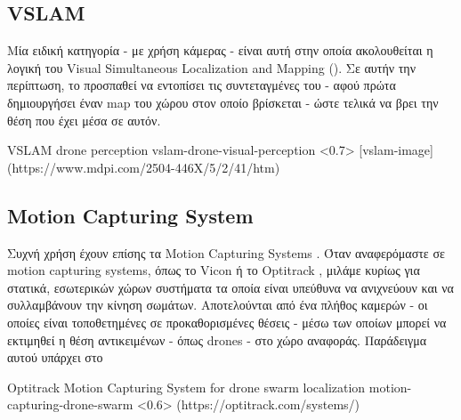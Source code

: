 \subsection{VSLAM}	\label{sec:related-vslam}
Μία ειδική κατηγορία - με χρήση κάμερας - είναι αυτή στην οποία ακολουθείται η λογική του Visual Simultaneous Localization and Mapping (). Σε αυτήν την περίπτωση, το  προσπαθεί να εντοπίσει τις συντεταγμένες του - αφού πρώτα δημιουργήσει έναν map του χώρου στον οποίο βρίσκεται - ώστε τελικά να βρει την θέση που έχει μέσα σε αυτόν.

\cite{vslam-for-drone-localization}

{VSLAM drone perception}%
{vslam-drone-visual-perception}%
<0.7>%
[vslam-image]%
(https://www.mdpi.com/2504-446X/5/2/41/htm)



\subsection{Motion Capturing System} \label{sec:related-motion-capturing-systems}
Συχνή χρήση έχουν επίσης τα Motion Capturing Systems \cite{motion-capture}. Όταν αναφερόμαστε σε motion capturing systems, όπως το Vicon \cite{vicon} ή το Optitrack \cite{optitrack}, μιλάμε κυρίως για στατικά, εσωτερικών χώρων συστήματα 
τα οποία είναι υπεύθυνα να ανιχνεύουν και να συλλαμβάνουν την κίνηση σωμάτων. Αποτελούνται από ένα πλήθος καμερών - οι οποίες είναι τοποθετημένες σε προκαθορισμένες θέσεις - μέσω των οποίων μπορεί να εκτιμηθεί η θέση αντικειμένων - όπως drones - στο χώρο αναφοράς. Παράδειγμα αυτού υπάρχει στο 

%
{Optitrack Motion Capturing System for drone swarm localization}%
{motion-capturing-drone-swarm}%
<0.6>%
(https://optitrack.com/systems/)




